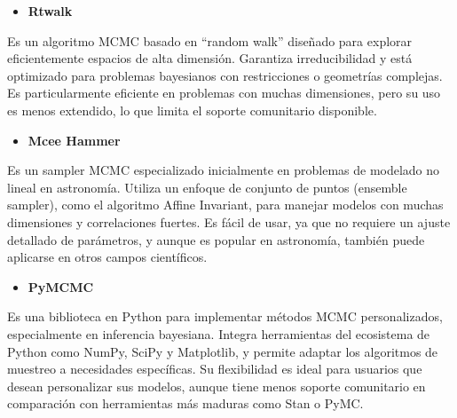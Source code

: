 \begin{itemize}
	\item \textbf{Rtwalk}
\end{itemize}
Es un algoritmo MCMC basado en “random walk” diseñado para explorar eficientemente espacios de alta dimensión. Garantiza irreducibilidad y está optimizado para problemas bayesianos con restricciones o geometrías complejas. Es particularmente eficiente en problemas con muchas dimensiones, pero su uso es menos extendido, lo que limita el soporte comunitario disponible.

\begin{itemize}
	\item \textbf{Mcee Hammer}
\end{itemize}
Es un sampler MCMC especializado inicialmente en problemas de modelado no lineal en astronomía. Utiliza un enfoque de conjunto de puntos (ensemble sampler), como el algoritmo Affine Invariant, para manejar modelos con muchas dimensiones y correlaciones fuertes. Es fácil de usar, ya que no requiere un ajuste detallado de parámetros, y aunque es popular en astronomía, también puede aplicarse en otros campos científicos.

\begin{itemize}
	\item \textbf{PyMCMC}
\end{itemize}
Es una biblioteca en Python para implementar métodos MCMC personalizados, especialmente en inferencia bayesiana. Integra herramientas del ecosistema de Python como NumPy, SciPy y Matplotlib, y permite adaptar los algoritmos de muestreo a necesidades específicas. Su flexibilidad es ideal para usuarios que desean personalizar sus modelos, aunque tiene menos soporte comunitario en comparación con herramientas más maduras como Stan o PyMC.